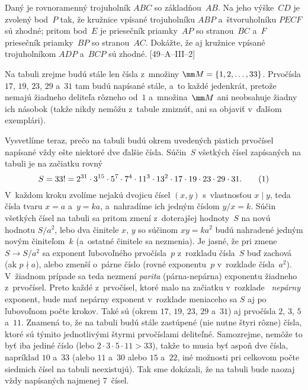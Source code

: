 {Daný je rovnoramenný trojuholník $ABC$ so základňou~$AB$. Na jeho výške~$CD$ je zvolený bod~$P$ tak, že kružnice vpísané trojuholníku $ABP$ a~štvoruholníku $PECF$ sú zhodné; pritom bod~$E$ je
priesečník priamky~$AP$ so stranou~$BC$ a~$F$ priesečník priamky~$BP$ so stranou~$AC$. Dokážte, že aj kružnice vpísané trojuholníkom $ADP$ a~$BCP$ sú zhodné. [49--A--III--2]
}

{%
Na tabuli zrejme budú stále len čísla z~množiny $\mm M=\{1,2,\dots,33\}$.
Prvočísla $17$, $19$, $23$, $29$ a~$31$ tam budú napísané stále, a~to každé
jedenkrát, pretože nemajú žiadneho deliteľa rôzneho od~$1$
a~množina~$\mm M$ ani neobsahuje žiadny ich násobok (takže nikdy nemôžu
z~tabule zmiznúť, ani sa objaviť v~ďalšom exemplári).

Vysvetlíme teraz, prečo na tabuli budú okrem uvedených piatich prvočísel
napísané vždy ešte niektoré dve ďalšie čísla.
Súčin~$S$ všetkých čísel zapísaných na tabuli je na začiatku
rovný
$$
S=33!=2^{31}\cdot3^{15}\cdot5^7\cdot7^4\cdot11^3
\cdot13^2\cdot17\cdot19\cdot23\cdot29\cdot31.
\tag1
$$
V~každom kroku zvolíme nejakú dvojicu čísel $(x,y)$
s~vlastnosťou $x\mid y$, teda čísla
tvaru $x=a$ a~$y=ka$, a~nahradíme ich jedným číslom $y/x=k$.
Súčin všetkých čísel na tabuli sa pritom zmení
z~doterajšej hodnoty~$S$ na novú hodnotu $S/a^2$,
lebo dva činitele $x$, $y$ so súčinom $xy=ka^2$
budú nahradené jedným novým činiteľom~$k$
(a~ostatné činitele sa nezmenia).
Je jasné, že pri zmene $S\rightarrow S/a^2$ sa exponent
ľubovoľného prvočísla~$p$ z~rozkladu čísla~$S$ buď zachová
(ak $p\nmid a$), alebo zmenší o~párne číslo (rovné exponentu~$p$
v~rozklade čísla~$a^2$). V~žiadnom prípade sa teda nezmení
{\it parita\/} (párna-nepárna) exponentu žiadneho z~prvočísel.
Preto každé z~prvočísel, ktoré malo na začiatku v~rozklade~
{\it nepárny\/} exponent, bude mať nepárny exponent v~rozklade meniaceho sa
$S$ aj po ľubovoľnom počte krokov. Také sú (okrem $17$, $19$, $23$, $29$ a~$31$)
aj prvočísla $2$, $3$, $5$ a~$11$. Znamená to, že na tabuli budú stále
zastúpené (nie nutne štyri rôzne) čísla, ktoré sú týmito
jednotlivými štyrmi prvočíslami deliteľné.
Samozrejme, nemôže to byť iba jediné číslo (lebo $2\cdot3\cdot5\cdot11>33$),
takže to musia byť aspoň dve čísla, napríklad $10$ a~$33$ (alebo $11$ a~$30$
alebo $15$ a~$22$, iné možnosti pri celkovom počte
siedmich čísel na tabuli neexistujú).
Tak sme dokázali, že na tabuli bude naozaj vždy
napísaných najmenej 7~čísel.

}
